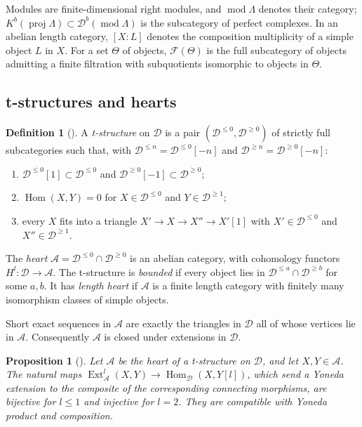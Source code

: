 \documentclass[11pt,reqno]{amsart}
\theoremstyle{plain}
\newtheorem{proposition}[theorem]{Proposition}
\theoremstyle{definition}
\newtheorem{definition}[theorem]{Definition}
\theoremstyle{remark}
\DeclareMathOperator{\Hom}{Hom}
\DeclareMathOperator{\Ext}{Ext}
\newcommand{\modd}{\operatorname{mod}}
\newcommand{\proj}{\operatorname{proj}}
\newcommand{\Db}{\mathcal{D}^b}
\newcommand{\Kb}{K^b}
\newcommand{\cD}{\mathcal{D}}
\newcommand{\cA}{\mathcal{A}}
\newcommand{\cF}{\mathcal{F}}
\begin{document}
Modules are finite-dimensional right modules, and $\modd\Lambda$ denotes their category; $\Kb(\proj\Lambda)\subset\Db(\modd\Lambda)$ is the subcategory of perfect complexes. In an abelian length category, $[X:L]$ denotes the composition multiplicity of a simple object $L$ in $X$. For a set $\Theta$ of objects, $\cF(\Theta)$ is the full subcategory of objects admitting a finite filtration with subquotients isomorphic to objects in $\Theta$.

\subsection{t-structures and hearts}

\begin{definition}[{\cite[D\'ef.~1.3.1]{BBD82}}]
A \emph{t-structure} on $\cD$ is a pair $(\cD^{\le0},\cD^{\ge0})$ of strictly full subcategories such that, with $\cD^{\le n}=\cD^{\le0}[-n]$ and $\cD^{\ge n}=\cD^{\ge0}[-n]$:
\begin{enumerate}
\item $\cD^{\le0}[1]\subset\cD^{\le0}$ and $\cD^{\ge0}[-1]\subset\cD^{\ge0}$;
\item $\Hom(X,Y)=0$ for $X\in\cD^{\le0}$ and $Y\in\cD^{\ge1}$;
\item every $X$ fits into a triangle $X'\to X\to X''\to X'[1]$ with $X'\in\cD^{\le0}$ and $X''\in\cD^{\ge1}$.
\end{enumerate}
The \emph{heart} $\cA=\cD^{\le0}\cap\cD^{\ge0}$ is an abelian category, with cohomology functors $H^l\colon\cD\to\cA$. The t-structure is \emph{bounded} if every object lies in $\cD^{\le a}\cap\cD^{\ge b}$ for some $a,b$. It has \emph{length heart} if $\cA$ is a finite length category with finitely many isomorphism classes of simple objects.
\end{definition}

Short exact sequences in $\cA$ are exactly the triangles in $\cD$ all of whose vertices lie in $\cA$. Consequently $\cA$ is closed under extensions in $\cD$.

\begin{proposition}[{\cite[Rem.~3.1.17]{BBD82}}]\label{prop:ext-comparison}
Let $\cA$ be the heart of a t-structure on $\cD$, and let $X,Y\in\cA$. The natural maps $\Ext^l_\cA(X,Y)\to\Hom_\cD(X,Y[l])$, which send a Yoneda extension to the composite of the corresponding connecting morphisms, are bijective for $l\le1$ and injective for $l=2$. They are compatible with Yoneda product and composition.
\end{proposition}
\end{document}
